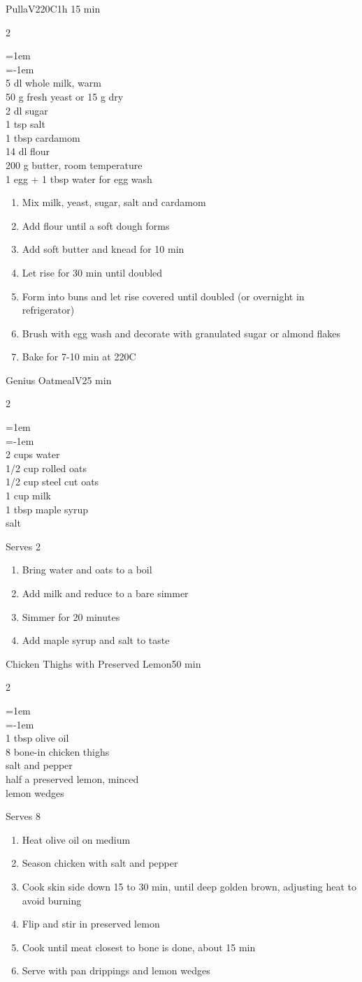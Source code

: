 \documentclass{article}
\newenvironment{recipe}[3][]
    {\begin{cardbase}[#1]{#2}{#3}
    \columnratio{0.333}
    \begin{paracol}{2}}
    {\end{paracol}\end{cardbase}}
\newcommand{\nextcolumn}{\switchcolumn}
\newenvironment{ingredients}
    {
    \begin{obeylines}
    \vspace{\parskip}
    \setlength{\parskip}{0.25em}
    \vspace{-0.25em}
    \leftskip=1em
    \parindent=-1em}
    {\end{obeylines}}
\newenvironment{steps}
    {\begin{enumerate}[leftmargin=*,topsep=0pt]}
    {\end{enumerate}}
\newcommand{\celsius}[1]{#1\textdegree{}C}
\newcommand{\tag}[1]{\hspace{1em}#1}
\newcommand{\symboltag}[2]{\tag{#1\hspace{0.4em}#2}}
\newcommand{\totaltime}[1]{\symboltag{\raisebox{-0.1em}{\small\StopWatchEnd}}{#1}}
\newcommand{\preheat}[1]{\symboltag{\Topbottomheat}{#1}}
\begin{document}
\begin{recipe}{Pulla}{\tag{V}\preheat{\celsius{220}}\totaltime{1h 15 min}}
\begin{ingredients}
5 dl whole milk, warm
50 g fresh yeast or 15 g dry
2 dl sugar
1 tsp salt
1 tbsp cardamom
14 dl flour
200 g butter, room temperature
1 egg + 1 tbsp water for egg wash
\end{ingredients}
\nextcolumn
\begin{steps}
    \item Mix milk, yeast, sugar, salt and cardamom
    \item Add flour until a soft dough forms
    \item Add soft butter and knead for 10 min
    \item Let rise for 30 min until doubled
    \item Form into buns and let rise covered until doubled (or overnight in refrigerator)
    \item Brush with egg wash and decorate with granulated sugar or almond flakes
    \item Bake for 7-10 min at \celsius{220}
\end{steps}
\end{recipe}

\begin{recipe}{Genius Oatmeal}{\tag{V}\totaltime{25 min}}
\begin{ingredients}
2 cups water
1/2 cup rolled oats
1/2 cup steel cut oats
1 cup milk
1 tbsp maple syrup
salt
\end{ingredients}
\nextcolumn
Serves 2
\begin{steps}
    \item Bring water and oats to a boil
    \item Add milk and reduce to a bare simmer
    \item Simmer for 20 minutes
    \item Add maple syrup and salt to taste
\end{steps}
\end{recipe}

\begin{recipe}{Chicken Thighs with Preserved Lemon}{\totaltime{50 min}}
\begin{ingredients}
1 tbsp olive oil
8 bone-in chicken thighs
salt and pepper
half a preserved lemon, minced
lemon wedges
\end{ingredients}
\nextcolumn
Serves 8
\begin{steps}
    \item Heat olive oil on medium
    \item Season chicken with salt and pepper
    \item Cook skin side down 15 to 30 min, until deep golden brown, adjusting heat to avoid burning
    \item Flip and stir in preserved lemon
    \item Cook until meat closest to bone is done, about 15 min
    \item Serve with pan drippings and lemon wedges
\end{steps}
\end{recipe}
\end{document}
